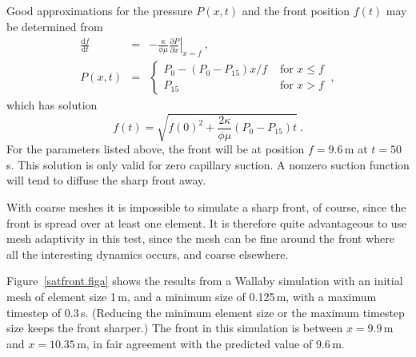 \documentclass[]{scrreprt}
\begin{document}
Good approximations for the pressure $P(x,t)$
and the front position $f(t)$ may be determined from
\begin{eqnarray}
\frac{{\mathrm d} f}{{\mathrm d} t} & = & -\frac{\kappa}{\phi\mu}
\left.\frac{\partial  P}{\partial x}\right|_{x = f} \ , \nonumber \\
P(x,t) & = & \left\{
\begin{array}{ll}
P_{0} - (P_{0}-P_{15})x/f & \mbox{ for } x\leq f  \\
P_{15} & \mbox{ for } x>f 
\end{array}
\right. \ ,
\label{eqn.predicted.bl.posn.eqna}
\end{eqnarray}
which has solution
\begin{equation}
f(t) = \sqrt{f(0)^{2} + \frac{2\kappa}{\phi\mu}(P_{0}-P_{15})t} \ .
\end{equation}
For the parameters listed above, the front will be at position
$f=9.6$\,m at $t=50$\,s.  This solution is only valid for zero
capillary suction.  A nonzero suction function will tend to diffuse
the sharp front away.

With coarse meshes it is impossible to simulate a sharp front, of
course, since the front is spread over at least one element.  It is
therefore quite advantageous to use mesh adaptivity in this test,
since the mesh can be fine around the front where all the interesting
dynamics occurs, and coarse elsewhere.

Figure~\ref{satfront.figa} shows the results from a Wallaby simulation
with an initial mesh of element size 1\,m, and a minimum size of
0.125\,m, with a maximum timestep of 0.3\,s.  (Reducing the minimum
element size or the maximum timestep size keeps the front sharper.)
The front in this simulation is between $x=9.9$\,m and $x=10.35$\,m,
in fair agreement with the predicted value of 9.6\,m.
\end{document}
